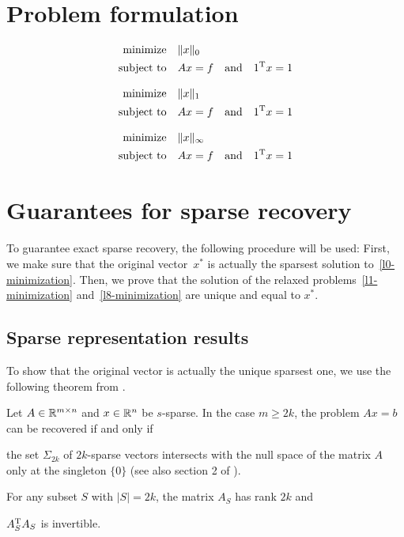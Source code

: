 \documentclass{article} %
\begin{document}
\section{Problem formulation}
\begin{equation}\label{l0-minimization}
  \begin{split}
    \text{minimize} &\quad \lVert x\rVert_0\\
    \text{subject to} &\quad Ax = f\quad\text{and}\quad 1^{\rm T} x = 1
  \end{split}
\end{equation}

\begin{equation}\label{l1-minimization}
  \begin{split}
    \text{minimize} &\quad \lVert x\rVert_1\\
    \text{subject to} &\quad Ax = f\quad\text{and}\quad 1^{\rm T} x = 1
  \end{split}
\end{equation}

\begin{equation}\label{l8-minimization}
  \begin{split}
    \text{minimize} &\quad \lVert x\rVert_\infty\\
    \text{subject to} &\quad Ax = f\quad\text{and}\quad 1^{\rm T} x = 1
  \end{split}
\end{equation}
\section{Guarantees for sparse recovery}
To guarantee exact sparse recovery, the following procedure will be used: First, we make sure that the original vector~$x^*$ is actually the sparsest solution to~\eqref{l0-minimization}. Then, we prove that the solution of the relaxed problems~\eqref{l1-minimization} and~\eqref{l8-minimization} are unique and equal to $x^*$.
\subsection{Sparse representation results}
To show that the original vector is actually the unique sparsest one, we use the following theorem from \cite{Dahmen_CS}.
\begin{theorem}
\label{thm:l0unique}
Let $A \in \mathbb{R}^{m\times n}$ and $x\in\mathbb{R}^n$ be $s$-sparse. In the case
$m\geq 2k$, the problem $Ax = b$ can be recovered if and only if
\begin{inparaenum}[(a)]
\item the set $\Sigma_{2k}$ of $2k$-sparse vectors intersects with the null space of the matrix $A$ only at the singleton $\{0\}$ (see also section 2 of \cite{Dahmen_CS}).
\item For any subset $S$ with $|S| = 2k$, the matrix $A_S$ has rank $2k$ and
\item $A_S^{\rm T} A_S$ is invertible.
\end{inparaenum}
\end{theorem}
\end{document}
